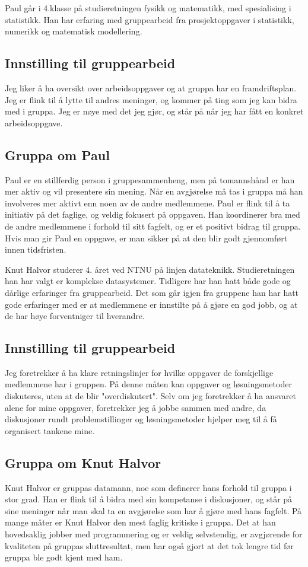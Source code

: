 Paul går i 4.klasse på studieretningen fysikk og matematikk, med spesialising i
statistikk. Han har erfaring med gruppearbeid fra prosjektoppgaver i statistikk, numerikk og matematisk modellering.

\subsection*{Innstilling til gruppearbeid}
Jeg liker å ha oversikt over arbeidsoppgaver og at gruppa har en framdriftsplan.
Jeg er flink til å lytte til andres meninger, og kommer på ting som jeg kan bidra med i gruppa.
Jeg er nøye med det jeg gjør, og står på når jeg har fått en konkret arbeidsoppgave.

\subsection*{Gruppa om Paul}
Paul er en stillferdig person i gruppesammenheng, men på tomannshånd er han mer
aktiv og vil presentere sin mening. Når en avgjørelse må tas i gruppa må han
involveres mer aktivt enn noen av de andre medlemmene. Paul er flink til å ta 
initiativ på det faglige, og veldig fokusert på oppgaven. Han koordinerer bra 
med de andre medlemmene i forhold til sitt fagfelt, og er et positivt bidrag til
gruppa. Hvis man gir Paul en oppgave, er man sikker på at den blir godt
gjennomført innen tidsfristen.

Knut Halvor studerer 4. året ved NTNU på linjen datateknikk. Studieretningen han 
har valgt er komplekse datasystemer. Tidligere har han hatt både gode og dårlige
erfaringer fra gruppearbeid. Det som går igjen fra gruppene han har hatt gode
erfaringer med er at medlemmene er innstilte på å gjøre en god jobb, og at de
har høye forventniger til hverandre.

\subsection*{Innstilling til gruppearbeid}
Jeg foretrekker å ha klare retningslinjer for hvilke oppgaver de forskjellige 
medlemmene har i gruppen. På denne måten kan oppgaver og løsningsmetoder diskuteres,
uten at de blir "overdiskutert". Selv om jeg foretrekker å ha ansvaret alene for mine oppgaver,
foretrekker jeg å jobbe sammen med andre, da diskusjoner rundt problemstillinger og
løsningsmetoder hjelper meg til å få organisert tankene mine.

\subsection*{Gruppa om Knut Halvor}
Knut Halvor er gruppas datamann, noe som definerer hans forhold til gruppa i
stor grad. Han er flink til å bidra med sin kompetanse i diskusjoner, og står på
sine meninger når man skal ta en avgjørelse som har å gjøre med hans fagfelt. På
mange måter er Knut Halvor den mest faglig kritiske i gruppa. Det at han hovedsaklig
jobber med programmering og er veldig selvstendig, er avgjørende for kvaliteten på 
gruppas sluttresultat, men har også gjort at det tok lengre tid før gruppa ble godt 
kjent med ham.

